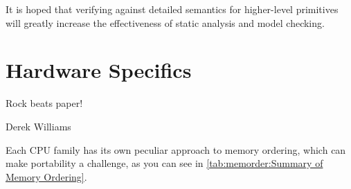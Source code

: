 It is hoped that verifying against detailed semantics for higher-level
primitives will greatly increase the effectiveness of static analysis
and model checking.

\section{Hardware Specifics}
\label{sec:memorder:Hardware Specifics}
%
\epigraph{Rock beats paper!}{Derek Williams}

Each CPU family has its own peculiar approach to memory ordering, which
can make portability a challenge, as you can see in
\cref{tab:memorder:Summary of Memory Ordering}.

